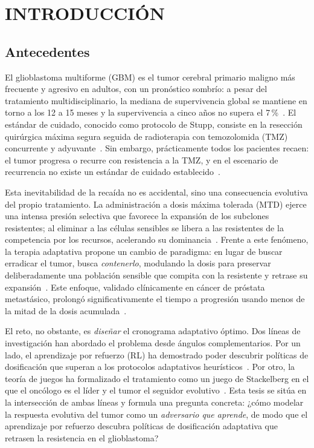 \chapter{INTRODUCCIÓN}
\label{cap:introduccion}

\section{Antecedentes}
\label{sec:antecedentes}

El glioblastoma multiforme (GBM) es el tumor cerebral primario maligno más frecuente y agresivo en adultos, con un pronóstico sombrío: a pesar del tratamiento multidisciplinario, la mediana de supervivencia global se mantiene en torno a los 12 a 15 meses y la supervivencia a cinco años no supera el 7\,\%~\cite{Tan2020,Sipos2025,Adegboyega2021}. El estándar de cuidado, conocido como protocolo de Stupp, consiste en la resección quirúrgica máxima segura seguida de radioterapia con temozolomida (TMZ) concurrente y adyuvante~\cite{Stupp2005,Jezierzanski2024}. Sin embargo, prácticamente todos los pacientes recaen: el tumor progresa o recurre con resistencia a la TMZ, y en el escenario de recurrencia no existe un estándar de cuidado establecido~\cite{Fernandes2017,Tan2020}.

Esta inevitabilidad de la recaída no es accidental, sino una consecuencia evolutiva del propio tratamiento. La administración a dosis máxima tolerada (MTD) ejerce una intensa presión selectiva que favorece la expansión de los subclones resistentes; al eliminar a las células sensibles se libera a las resistentes de la competencia por los recursos, acelerando su dominancia~\cite{Gatenby2022}. Frente a este fenómeno, la terapia adaptativa propone un cambio de paradigma: en lugar de buscar erradicar el tumor, busca \emph{contenerlo}, modulando la dosis para preservar deliberadamente una población sensible que compita con la resistente y retrase su expansión~\cite{Gallaher2017,Strobl2020}. Este enfoque, validado clínicamente en cáncer de próstata metastásico, prolongó significativamente el tiempo a progresión usando menos de la mitad de la dosis acumulada~\cite{Zhang2017}.

El reto, no obstante, es \emph{diseñar} el cronograma adaptativo óptimo. Dos líneas de investigación han abordado el problema desde ángulos complementarios. Por un lado, el aprendizaje por refuerzo (RL) ha demostrado poder descubrir políticas de dosificación que superan a los protocolos adaptativos heurísticos~\cite{Gallagher2024}. Por otro, la teoría de juegos ha formalizado el tratamiento como un juego de Stackelberg en el que el oncólogo es el líder y el tumor el seguidor evolutivo~\cite{Stankova2019}. Esta tesis se sitúa en la intersección de ambas líneas y formula una pregunta concreta: ¿cómo modelar la respuesta evolutiva del tumor como un \emph{adversario que aprende}, de modo que el aprendizaje por refuerzo descubra políticas de dosificación adaptativa que retrasen la resistencia en el glioblastoma?

